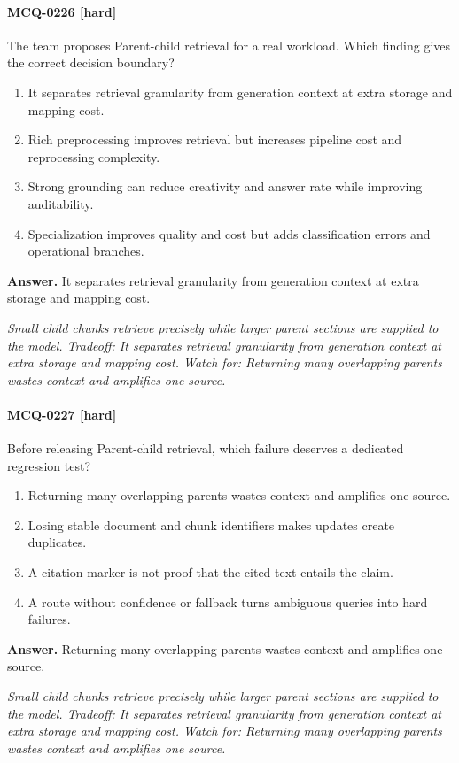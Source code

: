 \paragraph{MCQ-0226 [hard]} The team proposes Parent-child retrieval for a real workload. Which finding gives the correct decision boundary?
\begin{enumerate}[label=\Alph*.]
\item It separates retrieval granularity from generation context at extra storage and mapping cost.
\item Rich preprocessing improves retrieval but increases pipeline cost and reprocessing complexity.
\item Strong grounding can reduce creativity and answer rate while improving auditability.
\item Specialization improves quality and cost but adds classification errors and operational branches.
\end{enumerate}
\noindent\textbf{Answer.} It separates retrieval granularity from generation context at extra storage and mapping cost.
\par\textit{Small child chunks retrieve precisely while larger parent sections are supplied to the model. Tradeoff: It separates retrieval granularity from generation context at extra storage and mapping cost. Watch for: Returning many overlapping parents wastes context and amplifies one source.}
\paragraph{MCQ-0227 [hard]} Before releasing Parent-child retrieval, which failure deserves a dedicated regression test?
\begin{enumerate}[label=\Alph*.]
\item Returning many overlapping parents wastes context and amplifies one source.
\item Losing stable document and chunk identifiers makes updates create duplicates.
\item A citation marker is not proof that the cited text entails the claim.
\item A route without confidence or fallback turns ambiguous queries into hard failures.
\end{enumerate}
\noindent\textbf{Answer.} Returning many overlapping parents wastes context and amplifies one source.
\par\textit{Small child chunks retrieve precisely while larger parent sections are supplied to the model. Tradeoff: It separates retrieval granularity from generation context at extra storage and mapping cost. Watch for: Returning many overlapping parents wastes context and amplifies one source.}
